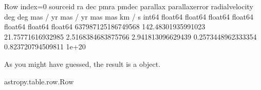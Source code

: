 \documentclass[letterpaper,10pt,english]{sphinxmanual}
\begin{document}
\begin{sphinxVerbatim}[commandchars=\\\{\}]
\PYGZlt{}Row index=0\PYGZgt{}
    source\PYGZus{}id              ra                dec                pmra              pmdec             parallax        parallax\PYGZus{}error  radial\PYGZus{}velocity
                          deg                deg              mas / yr           mas / yr             mas                mas             km / s    
      int64             float64            float64            float64            float64            float64            float64          float64    
\PYGZhy{}\PYGZhy{}\PYGZhy{}\PYGZhy{}\PYGZhy{}\PYGZhy{}\PYGZhy{}\PYGZhy{}\PYGZhy{}\PYGZhy{}\PYGZhy{}\PYGZhy{}\PYGZhy{}\PYGZhy{}\PYGZhy{}\PYGZhy{}\PYGZhy{}\PYGZhy{} \PYGZhy{}\PYGZhy{}\PYGZhy{}\PYGZhy{}\PYGZhy{}\PYGZhy{}\PYGZhy{}\PYGZhy{}\PYGZhy{}\PYGZhy{}\PYGZhy{}\PYGZhy{}\PYGZhy{}\PYGZhy{}\PYGZhy{}\PYGZhy{}\PYGZhy{}\PYGZhy{} \PYGZhy{}\PYGZhy{}\PYGZhy{}\PYGZhy{}\PYGZhy{}\PYGZhy{}\PYGZhy{}\PYGZhy{}\PYGZhy{}\PYGZhy{}\PYGZhy{}\PYGZhy{}\PYGZhy{}\PYGZhy{}\PYGZhy{}\PYGZhy{}\PYGZhy{} \PYGZhy{}\PYGZhy{}\PYGZhy{}\PYGZhy{}\PYGZhy{}\PYGZhy{}\PYGZhy{}\PYGZhy{}\PYGZhy{}\PYGZhy{}\PYGZhy{}\PYGZhy{}\PYGZhy{}\PYGZhy{}\PYGZhy{}\PYGZhy{}\PYGZhy{}\PYGZhy{}\PYGZhy{} \PYGZhy{}\PYGZhy{}\PYGZhy{}\PYGZhy{}\PYGZhy{}\PYGZhy{}\PYGZhy{}\PYGZhy{}\PYGZhy{}\PYGZhy{}\PYGZhy{}\PYGZhy{}\PYGZhy{}\PYGZhy{}\PYGZhy{}\PYGZhy{}\PYGZhy{} \PYGZhy{}\PYGZhy{}\PYGZhy{}\PYGZhy{}\PYGZhy{}\PYGZhy{}\PYGZhy{}\PYGZhy{}\PYGZhy{}\PYGZhy{}\PYGZhy{}\PYGZhy{}\PYGZhy{}\PYGZhy{}\PYGZhy{}\PYGZhy{}\PYGZhy{}\PYGZhy{}\PYGZhy{} \PYGZhy{}\PYGZhy{}\PYGZhy{}\PYGZhy{}\PYGZhy{}\PYGZhy{}\PYGZhy{}\PYGZhy{}\PYGZhy{}\PYGZhy{}\PYGZhy{}\PYGZhy{}\PYGZhy{}\PYGZhy{}\PYGZhy{}\PYGZhy{}\PYGZhy{} \PYGZhy{}\PYGZhy{}\PYGZhy{}\PYGZhy{}\PYGZhy{}\PYGZhy{}\PYGZhy{}\PYGZhy{}\PYGZhy{}\PYGZhy{}\PYGZhy{}\PYGZhy{}\PYGZhy{}\PYGZhy{}\PYGZhy{}
637987125186749568 142.48301935991023 21.75771616932985 \PYGZhy{}2.5168384683875766 2.941813096629439 \PYGZhy{}0.2573448962333354 0.823720794509811           1e+20
\end{sphinxVerbatim}

As you might have guessed, the result is a  object.

\begin{sphinxVerbatim}[commandchars=\\\{\}]
\PYG{p}{[}\PYG{p}{]}
\end{sphinxVerbatim}

\begin{sphinxVerbatim}[commandchars=\\\{\}]
astropy.table.row.Row
\end{sphinxVerbatim}
\end{document}
